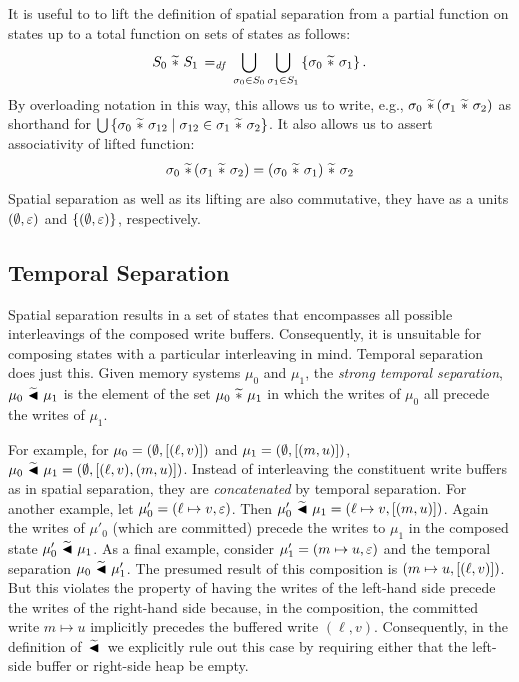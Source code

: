 \documentclass[11pt]{report}
\begin{document}
It is useful to to lift the definition of spatial separation from a partial function on states up to a total function on sets of states as follows: \[ S_0 \operatorname{\,\widetilde{\ast}\,} S_1 \operatorname{\;=_{\mathit{df}}\;} \bigcup_{\sigma_0 \in S_0} \bigcup_{\sigma_1 \in S_1} \left\lbrace \sigma_0 \operatorname{\,\widetilde{\ast}\,} \sigma_1 \right\rbrace.\] By overloading notation in this way, this allows us to write, e.g., $\sigma_0 \operatorname{\,\widetilde{\ast}\,} (\sigma_1 \operatorname{\,\widetilde{\ast}\,} \sigma_2)$ as shorthand for $\bigcup \left\lbrace \sigma_0 \operatorname{\,\widetilde{\ast}\,} \sigma_{12} \mid \sigma_{12} \in \sigma_1 \operatorname{\,\widetilde{\ast}\,} \sigma_2 \right\rbrace$. It also allows us to assert associativity of lifted function: \[ \sigma_0 \operatorname{\,\widetilde{\ast}\,} (\sigma_1 \operatorname{\,\widetilde{\ast}\,} \sigma_2) = (\sigma_0 \operatorname{\,\widetilde{\ast}\,} \sigma_1) \operatorname{\,\widetilde{\ast}\,} \sigma_2 \] Spatial separation as well as its lifting are also commutative, they have as a units $(\operatorname{\emptyset},\varepsilon)$ and $\left\lbrace (\operatorname{\emptyset},\varepsilon) \right\rbrace$, respectively. 

\subsection{Temporal Separation}
\label{sec:sequential-temporal-separation}

Spatial separation results in a set of states that encompasses all possible interleavings of the composed write buffers. Consequently, it is unsuitable for composing states with a particular interleaving in mind. Temporal separation does just this. Given memory systems $\mu_0$ and $\mu_1$, the \emph{strong temporal separation}, $\mu_0 \operatorname{\,\widetilde{\blacktriangleleft}\,} \mu_1$ is the element of the set $\mu_0 \operatorname{\,\widetilde{\ast}\,} \mu_1$ in which the writes of $\mu_0$ all precede the writes of $\mu_1$. 

For example, for $\mu_0 = (\operatorname{\emptyset},\left[(\ell,v)\right])$ and $\mu_1 = (\operatorname{\emptyset},\left[(m,u)\right])$, $\mu_0 \operatorname{\,\widetilde{\blacktriangleleft}\,} \mu_1 = (\operatorname{\emptyset},\left[(\ell,v),(m,u)\right])$. Instead of interleaving the constituent write buffers as in spatial separation, they are \emph{concatenated} by temporal separation. For another example, let $\mu'_0 = (\ell \mapsto v, \varepsilon)$. Then $\mu'_0 \operatorname{\,\widetilde{\blacktriangleleft}\,} \mu_1 = (\ell \mapsto v, \left[(m,u)\right])$. Again the writes of $\mu'_0$ (which are committed) precede the writes to $\mu_1$ in the composed state $\mu'_0 \operatorname{\,\widetilde{\blacktriangleleft}\,} \mu_1$. As a final example, consider $\mu'_1 = (m \mapsto u, \varepsilon)$ and the temporal separation $\mu_0 \operatorname{\,\widetilde{\blacktriangleleft}\,} \mu'_1$. The presumed result of this composition is $(m \mapsto u, \left[(\ell,v)\right])$. But this violates the property of having the writes of the left-hand side precede the writes of the right-hand side because, in the composition, the committed write $m \mapsto u$ implicitly precedes the buffered write $(\ell,v)$. Consequently, in the definition of $\operatorname{\,\widetilde{\blacktriangleleft}\,}$ we explicitly rule out this case by requiring either that the left-side buffer or right-side heap be empty. 
\end{document}
